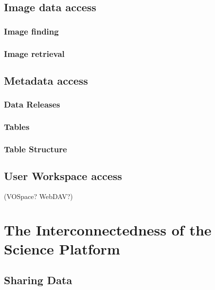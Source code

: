 \documentclass[DM,lsstdraft,toc]{lsstdoc}
\begin{document}
\subsection{Image data access}\label{image-data-access}

\subsubsection{Image finding}\label{image-finding}

\subsubsection{Image retrieval}\label{image-retrieval}

\subsection{Metadata access}\label{metadata-access}

\subsubsection{Data Releases}\label{data-releases}

\subsubsection{Tables}\label{tables}

\subsubsection{Table Structure}\label{table-structure}

\subsection{User Workspace access}\label{user-workspace-access}

(VOSpace?  WebDAV?)

\section{The Interconnectedness of the Science Platform}\label{interconnectedness-of-the-science-platform}

\subsection{Sharing Data}\label{sharing-data}
\end{document}

